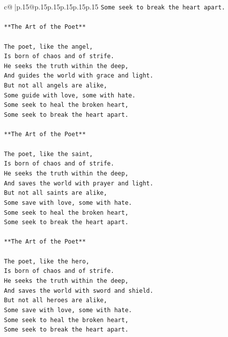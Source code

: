 \documentclass{article}
\begin{document}
{\begin{supertabular}{c@{$\;$}|p{.15\linewidth}@{}p{.15\linewidth}p{.15\linewidth}p{.15\linewidth}p{.15\linewidth}p{.15\linewidth}}
{{{\texttt{Some seek to break the heart apart.} \\
\\ 
\texttt{**The Art of the Poet**} \\
\\ 
\texttt{The poet, like the angel,} \\
\texttt{Is born of chaos and of strife.} \\
\texttt{He seeks the truth within the deep,} \\
\texttt{And guides the world with grace and light.} \\
\texttt{But not all angels are alike,} \\
\texttt{Some guide with love, some with hate.} \\
\texttt{Some seek to heal the broken heart,} \\
\texttt{Some seek to break the heart apart.} \\
\\ 
\texttt{**The Art of the Poet**} \\
\\ 
\texttt{The poet, like the saint,} \\
\texttt{Is born of chaos and of strife.} \\
\texttt{He seeks the truth within the deep,} \\
\texttt{And saves the world with prayer and light.} \\
\texttt{But not all saints are alike,} \\
\texttt{Some save with love, some with hate.} \\
\texttt{Some seek to heal the broken heart,} \\
\texttt{Some seek to break the heart apart.} \\
\\ 
\texttt{**The Art of the Poet**} \\
\\ 
\texttt{The poet, like the hero,} \\
\texttt{Is born of chaos and of strife.} \\
\texttt{He seeks the truth within the deep,} \\
\texttt{And saves the world with sword and shield.} \\
\texttt{But not all heroes are alike,} \\
\texttt{Some save with love, some with hate.} \\
\texttt{Some seek to heal the broken heart,} \\
\texttt{Some seek to break the heart apart.} \\
}}}
\end{supertabular}}
\end{document}

